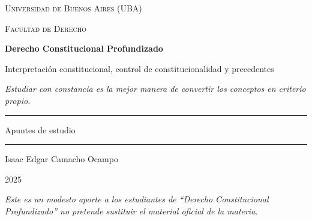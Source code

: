 \documentclass[12pt,oneside]{book}
\newcommand{\universidad}{Universidad de Buenos Aires (UBA)}
\newcommand{\facultad}{Facultad de Derecho}
\newcommand{\materia}{Derecho Constitucional Profundizado}
\newcommand{\subtitulo}{Interpretación constitucional, control de constitucionalidad y precedentes}
\newcommand{\autor}{Isaac Edgar Camacho Ocampo}
\newcommand{\anio}{2025}
\begin{document}

\begin{titlepage}

\thispagestyle{empty}

\begin{center}

\vspace*{1cm}

{\large \textsc{\universidad}}

\vspace{0.2cm}

{\large \textsc{\facultad}}

\vspace{3cm}

{\Huge \textbf{\materia}}

\vspace{1cm}

{\LARGE \subtitulo}

\vspace{0.8cm}

\textit{Estudiar con constancia es la mejor manera de convertir los conceptos en criterio propio.}

\vspace{1.2cm}

\rule{0.70\textwidth}{0.5pt}

\vspace{0.5cm}

{\large Apuntes de estudio}

\vspace{0.5cm}

\rule{0.70\textwidth}{0.5pt}

\vfill

{\large \autor}

\vspace{0.3cm}

{\large \anio}

\end{center}

\vfill

\begin{flushleft}
\textit{Este es un modesto aporte a los estudiantes de ``Derecho Constitucional Profundizado'' no pretende sustituir el material oficial de la materia.}
\end{flushleft}

\end{titlepage}
\end{document}
